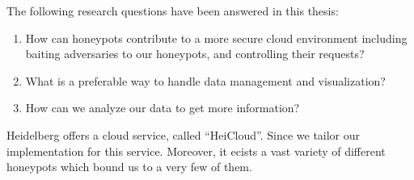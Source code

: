 
The following research questions have been answered in this thesis:

\begin{enumerate}
    \item How can honeypots contribute to a more secure cloud environment including baiting adversaries to our honeypots, and controlling their requests?
    \item What is a preferable way to handle data management and visualization?
    \item How can we analyze our data to get more information?
\end{enumerate}


Heidelberg offers a cloud service, called \enquote{HeiCloud}.
Since  we tailor our implementation for this service.
Moreover, it ecists a vast variety of different honeypots which bound us to a very few of them. 
